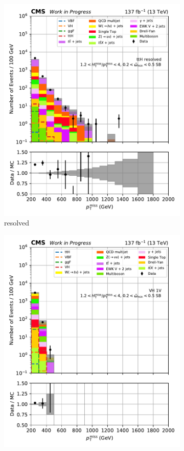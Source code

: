 \begin{figure}[htbp]
\begin{subfigure}[b]{0.24\textwidth}
        \includegraphics[width=\textwidth]{figures/region_plots/2016to18/sideband_1/ttH_resolved.pdf}
        \caption{\ttH resolved}
    \end{subfigure}
    \hfill
    \begin{subfigure}[b]{0.24\textwidth}
        \includegraphics[width=\textwidth]{figures/region_plots/2016to18/sideband_1/VH_1V.pdf}

\end{subfigure}
\end{figure}
